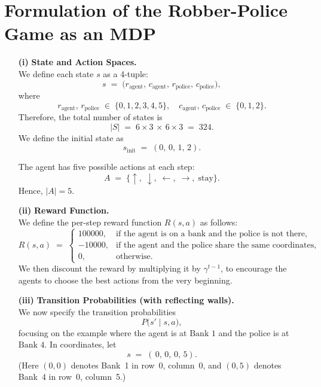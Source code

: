 \section*{Formulation of the Robber-Police Game as an MDP}

\begin{enumerate}

  \item[\textbf{(i)}]
    \textbf{State and Action Spaces.} \\
    We define each state \(s\) as a 4-tuple:
    \[
      s \;=\; \bigl(r_{\text{agent}},\,c_{\text{agent}},\,r_{\text{police}},\,c_{\text{police}}\bigr),
    \]
    where
    \[
      r_{\text{agent}},\,r_{\text{police}} \;\in\;\{0,1,2,3,4,5\},
      \quad
      c_{\text{agent}},\,c_{\text{police}} \;\in\;\{0,1,2\}.
    \]
    Therefore, the total number of states is
    \[
      |S| \;=\; 6 \times 3 \,\times\, 6 \times 3 \;=\; 324.
    \]
    We define the initial state as
    \[
      s_{\text{init}} \;=\; (0,\,0,\,1,\,2).
    \]

    The agent has five possible actions at each step:
    \[
      A \;=\; \{\uparrow,\;\downarrow,\;\leftarrow,\;\rightarrow,\;\text{stay}\}.
    \]
    Hence, \(\lvert A \rvert = 5\).

  \item[\textbf{(ii)}]
    \textbf{Reward Function.} \\
    We define the per-step reward function \(R(s,a)\) as follows:
    \[
      R(s, a) \;=\;
      \begin{cases}
        100000, & \text{if the agent is on a bank and the police is not there,} \\
        -10000, & \text{if the agent and the police share the same coordinates,} \\
        0, & \text{otherwise.}
      \end{cases}
    \]
    We then discount the reward by multiplying it by \(\gamma^{t-1}\), to encourage the agents to choose the best actions from the very beginning.

  \item[\textbf{(iii)}]
    \textbf{Transition Probabilities (with reflecting walls).} \\
    We now specify the transition probabilities
    \[
      P\bigl(s' \mid s, a\bigr),
    \]
    focusing on the example where the agent is at \(\text{Bank 1}\) and the police is at \(\text{Bank 4}\). 
    In coordinates, let
    \[
      s \;=\; (\,0,\,0,\,0,\,5).
    \]
    (Here \((0,0)\) denotes Bank~1 in row~0, column~0, and \((0,5)\) denotes Bank~4 in row~0, column~5.)


\end{enumerate}
